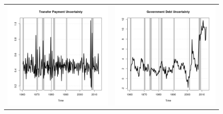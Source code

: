 \documentclass[11pt]{article}
\begin{document}
\begin{figure}
\begin{center}
\begin{tabular}{cc}
\includegraphics[scale=0.45]{./results/pics0.01/fpucoin_transfers.png} & \includegraphics[scale=0.45]{./results/pics0.01/fpucoin_debt.png}  
\end{tabular}
\end{center}
\end{figure} 
\end{document}
